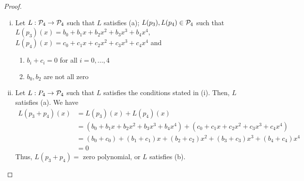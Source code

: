 \begin{proof}
    \renewcommand{\qedsymbol}{$\blacksquare$}
    \begin{enumerate}[(i)]
        \item Let $L:\P_4\rightarrow\P_4$ such that $L$ satisfies (a); $L(p_3), L(p_4)\in\P_4$ such that $L(p_3)(x)=b_0+b_1x+b_2x^2+b_3x^3+b_4x^4$, $L(p_4)(x)=c_0+c_1x+c_2x^2+c_3x^3+c_4x^4$ and
        \begin{enumerate}[(1)]
            \item $b_i+c_i=0$ for all $i=0,...,4$
            \item $b_0,b_2$ are not all zero
        \end{enumerate}
        \item Let $L:P_4\rightarrow\P_4$ such that $L$ satisfies the conditions stated in (i). Then, $L$ satisfies (a).
        We have 
        \[
            \begin{aligned}
                L(p_3+p_4)(x) &= L(p_3)(x)+L(p_4)(x)\\
                &= (b_0+b_1x+b_2x^2+b_3x^3+b_4x^4)+(c_0+c_1x+c_2x^2+c_3x^3+c_4x^4)\\
                &= (b_0+c_0)+(b_1+c_1)x+(b_2+c_2)x^2+(b_3+c_3)x^3+(b_4+c_4)x^4\\
                &= 0
            \end{aligned}
        \]
        Thus, $L(p_3+p_4)=$ zero polynomial, or $L$ satisfies (b).
        

\end{enumerate}
\end{proof}
